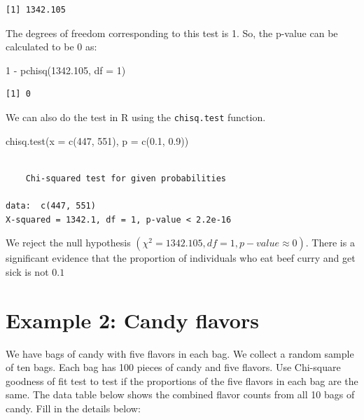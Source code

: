 \documentclass[
]{book}
\newenvironment{Shaded}{\begin{snugshade}}{\end{snugshade}}
\newcommand{\AttributeTok}[1]{\textcolor[rgb]{0.77,0.63,0.00}{#1}}
\newcommand{\DecValTok}[1]{\textcolor[rgb]{0.00,0.00,0.81}{#1}}
\newcommand{\FloatTok}[1]{\textcolor[rgb]{0.00,0.00,0.81}{#1}}
\newcommand{\FunctionTok}[1]{\textcolor[rgb]{0.00,0.00,0.00}{#1}}
\newcommand{\NormalTok}[1]{#1}
\newcommand{\SpecialCharTok}[1]{\textcolor[rgb]{0.00,0.00,0.00}{#1}}
\begin{document}
\begin{verbatim}
[1] 1342.105
\end{verbatim}

The degrees of freedom corresponding to this test is 1. So, the p-value can be calculated to be 0 as:

\begin{Shaded}
\begin{Highlighting}[]
\DecValTok{1} \SpecialCharTok{{-}} \FunctionTok{pchisq}\NormalTok{(}\FloatTok{1342.105}\NormalTok{, }\AttributeTok{df =} \DecValTok{1}\NormalTok{)}
\end{Highlighting}
\end{Shaded}

\begin{verbatim}
[1] 0
\end{verbatim}

We can also do the test in R using the \texttt{chisq.test} function.

\begin{Shaded}
\begin{Highlighting}[]
\FunctionTok{chisq.test}\NormalTok{(}\AttributeTok{x =} \FunctionTok{c}\NormalTok{(}\DecValTok{447}\NormalTok{, }\DecValTok{551}\NormalTok{), }\AttributeTok{p =} \FunctionTok{c}\NormalTok{(}\FloatTok{0.1}\NormalTok{, }\FloatTok{0.9}\NormalTok{))}
\end{Highlighting}
\end{Shaded}

\begin{verbatim}

    Chi-squared test for given probabilities

data:  c(447, 551)
X-squared = 1342.1, df = 1, p-value < 2.2e-16
\end{verbatim}

We reject the null hypothesis \((\chi^2 = 1342.105, df = 1, p-value \approx 0)\). There is a significant evidence that the proportion of individuals who eat beef curry and get sick is not \(0.1\)

\hypertarget{example-2-candy-flavors}{%
\section{Example 2: Candy flavors}\label{example-2-candy-flavors}}

We have bags of candy with five flavors in each bag. We collect a random sample of ten bags. Each bag has 100 pieces of candy and five flavors. Use Chi-square goodness of fit test to test if the proportions of the five flavors in each bag are the same. The data table below shows the combined flavor counts from all 10 bags of candy. Fill in the details below:
\end{document}
